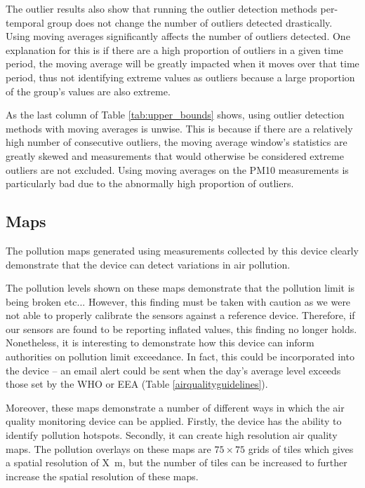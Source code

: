 \documentclass[11pt,twosided,a4paper]{report}
\begin{document}
The outlier results also show that running the outlier detection methods per-temporal group does not change the number of outliers detected drastically. Using moving averages significantly affects the number of outliers detected. One explanation for this is if there are a high proportion of outliers in a given time period, the moving average will be greatly impacted when it moves over that time period, thus not identifying extreme values as outliers because a large proportion of the group's values are also extreme.

As the last column of Table \ref{tab:upper_bounds} shows, using outlier detection methods with moving averages is unwise. This is because if there are a relatively high number of consecutive outliers, the moving average window's statistics are greatly skewed and measurements that would otherwise be considered extreme outliers are not excluded. Using moving averages on the PM10 measurements is particularly bad due to the abnormally high proportion of outliers.


\subsection{Maps}

The pollution maps generated using measurements collected by this device clearly demonstrate that the device can detect variations in air pollution. 

The pollution levels shown on these maps demonstrate that the pollution limit is being broken etc... However, this finding must be taken with caution as we were not able to properly calibrate the sensors against a reference device. Therefore, if our sensors are found to be reporting inflated values, this finding no longer holds. Nonetheless, it is interesting to demonstrate how this device can inform authorities on pollution limit exceedance. In fact, this could be incorporated into the device -- an email alert could be sent when the day's average level exceeds those set by the WHO or EEA (Table \ref{airqualityguidelines}). 

Moreover, these maps demonstrate a number of different ways in which the air quality monitoring device can be applied. Firstly, the device has the ability to identify pollution hotspots. Secondly, it can create high resolution air quality maps. The pollution overlays on these maps are $75 \times 75$ grids of tiles which gives a spatial resolution of X~m, but the number of tiles can be increased to further increase the spatial resolution of these maps.
\end{document}
